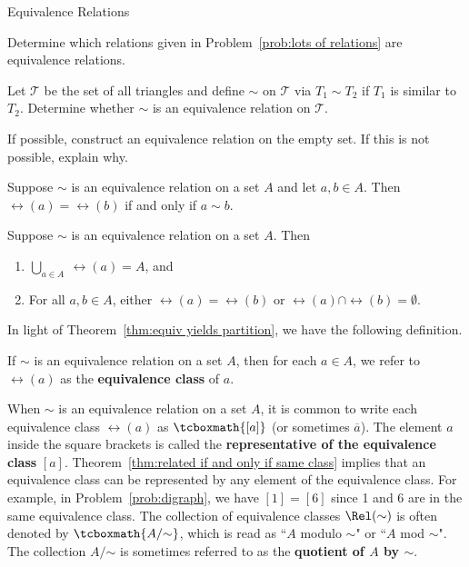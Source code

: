 \begin{section}{Equivalence Relations}
\begin{problem}\label{prob:equiv from lots of relations}
Determine which relations given in Problem~\ref{prob:lots of relations} are equivalence relations.
\end{problem}

\begin{problem}
Let $\mathcal{T}$ be the set of all triangles and define $\sim$ on $\mathcal{T}$ via $T_1\sim T_2$ if $T_1$ is similar to $T_2$.  Determine whether $\sim$ is an equivalence relation on $\mathcal{T}$.
\end{problem}

\begin{problem}
If possible, construct an equivalence relation on the empty set.  If this is not possible, explain why.
\end{problem}

\begin{theorem}\label{thm:related if and only if same class}
Suppose $\sim$ is an equivalence relation on a set $A$ and let $a,b\in A$.  Then $\rel(a)=\rel(b)$ if and only if $a\sim b$.
\end{theorem}

\begin{theorem}\label{thm:equiv yields partition}
Suppose $\sim$ is an equivalence relation on a set $A$.  Then
\begin{enumerate}[label=\textrm{(\alph*)}]
\item $\displaystyle \bigcup_{a\in A}\ \rel(a)=A$, and
\item\label{thm:equiv yields partition b} For all $a,b\in A$, either $\rel(a)=\rel(b)$ or $\rel(a)\cap \rel(b)=\emptyset$.
\end{enumerate}
\end{theorem}

In light of Theorem~\ref{thm:equiv yields partition}, we have the following definition.

\begin{definition}\label{def:equivalence class}
If $\sim$ is an equivalence relation on a set $A$, then for each $a\in A$, we refer to $\rel(a)$ as the \textbf{equivalence class} of $a$.
\end{definition}

When $\sim$ is an equivalence relation on a set $A$, it is common to write each equivalence class $\rel(a)$ as $\tcboxmath{[a]}$ (or sometimes $\overline{a}$). The element $a$ inside the square brackets is called the \textbf{representative of the equivalence class} $[a]$.  Theorem~\ref{thm:related if and only if same class} implies that an equivalence class can be represented by any element of the equivalence class.  For example, in Problem~\ref{prob:digraph}, we have $[1]=[6]$ since 1 and 6 are in the same equivalence class. The collection of equivalence classes $\Rel(\sim)$ is often denoted by $\tcboxmath{A/\mathord\sim}$, which is read as ``$A$ modulo $\sim$" or ``$A$ mod $\sim$".  The collection $A/\mathord\sim$ is sometimes referred to as the \textbf{quotient of $A$ by $\sim$}.


\end{section}
